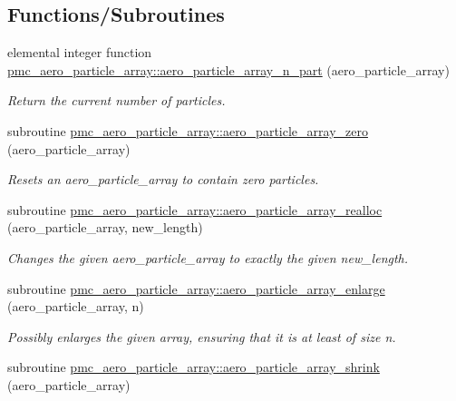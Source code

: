 \subsection*{Functions/\+Subroutines}
\begin{DoxyCompactItemize}
\item 
elemental integer function \mbox{\hyperlink{namespacepmc__aero__particle__array_a07eb4b0a376bb87a889b7d9070f46b90}{pmc\+\_\+aero\+\_\+particle\+\_\+array\+::aero\+\_\+particle\+\_\+array\+\_\+n\+\_\+part}} (aero\+\_\+particle\+\_\+array)
\begin{DoxyCompactList}\small\item\em Return the current number of particles. \end{DoxyCompactList}\item 
subroutine \mbox{\hyperlink{namespacepmc__aero__particle__array_aba7d47622753636d93746a4cbe3c0222}{pmc\+\_\+aero\+\_\+particle\+\_\+array\+::aero\+\_\+particle\+\_\+array\+\_\+zero}} (aero\+\_\+particle\+\_\+array)
\begin{DoxyCompactList}\small\item\em Resets an aero\+\_\+particle\+\_\+array to contain zero particles. \end{DoxyCompactList}\item 
subroutine \mbox{\hyperlink{namespacepmc__aero__particle__array_a72e276df4d9db217ea0b63eb8d518d1b}{pmc\+\_\+aero\+\_\+particle\+\_\+array\+::aero\+\_\+particle\+\_\+array\+\_\+realloc}} (aero\+\_\+particle\+\_\+array, new\+\_\+length)
\begin{DoxyCompactList}\small\item\em Changes the given aero\+\_\+particle\+\_\+array to exactly the given new\+\_\+length. \end{DoxyCompactList}\item 
subroutine \mbox{\hyperlink{namespacepmc__aero__particle__array_a49841804057f30972e8c2c855c0a8a27}{pmc\+\_\+aero\+\_\+particle\+\_\+array\+::aero\+\_\+particle\+\_\+array\+\_\+enlarge}} (aero\+\_\+particle\+\_\+array, n)
\begin{DoxyCompactList}\small\item\em Possibly enlarges the given array, ensuring that it is at least of size n. \end{DoxyCompactList}\item 
subroutine \mbox{\hyperlink{namespacepmc__aero__particle__array_a0b023fbb97338eae021e719a3044b66a}{pmc\+\_\+aero\+\_\+particle\+\_\+array\+::aero\+\_\+particle\+\_\+array\+\_\+shrink}} (aero\+\_\+particle\+\_\+array)

\end{DoxyCompactItemize}
